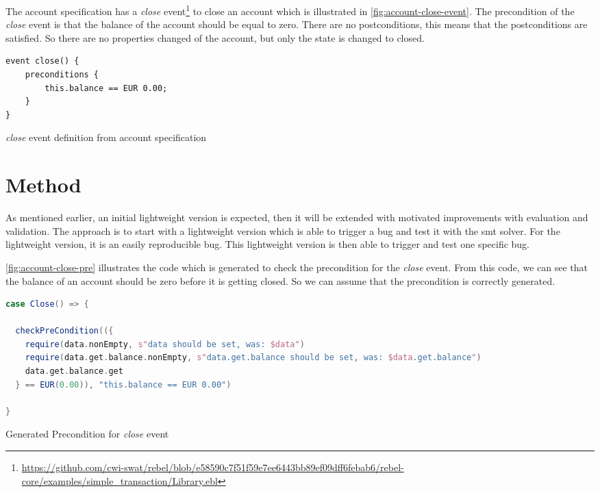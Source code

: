 The account specification has a \textit{close} event\footnote{\url{https://github.com/cwi-swat/rebel/blob/e58590c7f51f59e7ee6443bb89ef09dff6febab6/rebel-core/examples/simple_transaction/Library.ebl}}
to close an account which is illustrated in \autoref{fig:account-close-event}.
The precondition of the \textit{close} event is that the balance of the account should be
equal to zero. There are no postconditions, this means that the postconditions
are satisfied. So there are no properties changed of the account, but only the state
is changed to closed.

\begin{sourcecode}[h!]
\begin{lstlisting}[]
event close() {
	preconditions {
		this.balance == EUR 0.00;
	}
}
\end{lstlisting}
\caption{\textit{close} event definition from account specification}\label{fig:account-close-event}
\end{sourcecode}
\FloatBarrier

\section{Method}

As mentioned earlier, an initial lightweight version is expected, then it will
be extended with motivated improvements with evaluation and validation. The
approach is to start with a lightweight version which is able to trigger a bug
and test it with the \gls{smt} solver. For the lightweight version, it is an easily
reproducible bug. This lightweight version is then able to trigger and test one
specific bug.

\autoref{fig:account-close-pre} illustrates the code which is generated to check
the precondition for the \textit{close} event. From this code, we can see that the
balance of an account should be zero before it is getting closed. So we can
assume that the precondition is correctly generated.

\begin{sourcecode}[h!]
\begin{lstlisting}[language=scala]
case Close() => {

  checkPreCondition(({
    require(data.nonEmpty, s"data should be set, was: $data")
    require(data.get.balance.nonEmpty, s"data.get.balance should be set, was: $data.get.balance")
    data.get.balance.get
  } == EUR(0.00)), "this.balance == EUR 0.00")

}
\end{lstlisting}
\caption{Generated Precondition for \textit{close} event}\label{fig:account-close-pre}
\end{sourcecode}
\FloatBarrier

